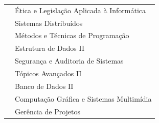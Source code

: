 \documentclass[
	10pt,				%
	openright,			%
	twoside,			%
	a4paper,			%
	english,			%
	french,				%
	brazil,				%
	sumario=tradicional
]{abntex2}
\begin{document}
\begin{table}[]
{\begin{tabular}{@{}l|l@{}}
			\nameref{5_etica}               & Ética e Legislação Aplicada à Informática                                 \\
			\nameref{5_sd}                  & Sistemas Distribuídos                                                     \\
			\nameref{5_lab}                 & Métodos e Técnicas de Programação                                         \\ \midrule	
			\nameref{6_ia}                  & Estrutura de Dados II                                                     \\
			\nameref{6_seginfo}             & Segurança e Auditoria de Sistemas                                         \\
			\nameref{6_empdig}              & Tópicos Avançados II                                                      \\
			\nameref{6_datascience}         & Banco de Dados II                                                         \\
			\nameref{6_opta}                & Computação Gráfica e Sistemas Multimídia                                  \\
			\nameref{6_optb}                & Gerência de Projetos                                                       \\ \bottomrule
		\end{tabular}%
	}
\end{table}

\end{document}
